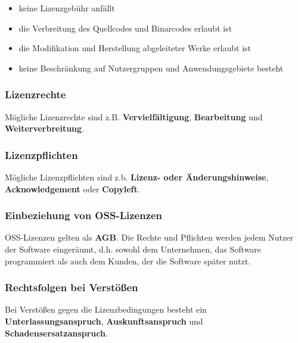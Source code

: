 \documentclass[12pt,A4]{extarticle}
\begin{document}
\begin{itemize}
  \item{keine Lizenzgebühr anfällt}
  \item{die Verbreitung des Quellcodes und Binarcodes erlaubt ist}
  \item{die Modifikation und Herstellung abgeleiteter Werke erlaubt ist}
  \item{keine Beschränkung auf Nutzergruppen und Anwendungsgebiete besteht}
\end{itemize}

\subsubsection{Lizenzrechte}
Mögliche Lizenzrechte sind z.B. \textbf{Vervielfältigung}, \textbf{Bearbeitung} und \textbf{Weiterverbreitung}.

\subsubsection{Lizenzpflichten}
Mögliche Lizenzpflichten sind z.b. \textbf{Lizenz- oder Änderungshinweise}, \textbf{Acknowledgement} oder \textbf{Copyleft}.

\subsubsection{Einbeziehung von OSS-Lizenzen}
OSS-Lizenzen gelten als \textbf{AGB}. Die Rechte und Pflichten werden jedem Nutzer der Software eingeräumt, d.h. sowohl dem Unternehmen, das Software programmiert als auch dem Kunden, der die Software später nutzt.

\subsubsection{Rechtsfolgen bei Verstößen}
Bei Verstößen gegen die Lizenzbedingungen besteht ein \textbf{Unterlassungsanspruch}, \textbf{Auskunftsanspruch} und \textbf{Schadensersatzanspruch}.
\end{document}
